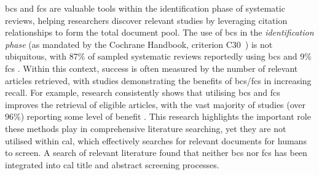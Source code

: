 \documentclass[10pt,oneside]{book}
\begin{document}
\gls*{bcs} and \gls*{fcs} are valuable tools within the identification phase of systematic reviews, helping researchers discover relevant studies by leveraging citation relationships to form the total document pool. The use of \gls*{bcs} in the \emph{identification phase} (as mandated by the Cochrane Handbook, criterion C30~\cite{noauthor_mecir_nodate}) is not ubiquitous, with 87\% of sampled systematic reviews reportedly using \gls*{bcs} and 9\% \gls*{fcs} \cite{briscoe_conduct_2019}. Within this context, success is often measured by the number of relevant articles retrieved, with studies demonstrating the benefits of \gls*{bcs}/\gls*{fcs} in increasing recall. For example, research consistently shows that utilising \gls*{bcs} and \gls*{fcs} improves the retrieval of eligible articles, with the vast majority of studies (over 96\%) reporting some level of benefit \cite{hirt_citation_2023}. This research highlights the important role these methods play in comprehensive literature searching, yet they are not utilised within \gls*{cal}, which effectively searches for relevant documents for humans to screen. A search of relevant literature found that neither \gls*{bcs} nor \gls*{fcs} has been integrated into \gls*{cal} title and abstract screening processes.
\end{document}
